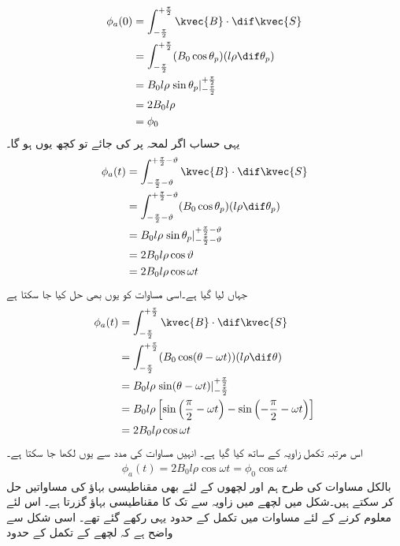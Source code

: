 \begin{gather}
\begin{aligned}
\phi_a(0)&=\int_{-\frac{\pi}{2}}^{+\frac{\pi}{2}} \kvec{B} \cdot \dif \kvec{S}\\
&=\int_{-\frac{\pi}{2}}^{+\frac{\pi}{2}} (B_0 \cos \theta_p)(l \rho \dif \theta_p)\\
&=B_0 l \rho \left. \sin \theta_p \right|_{-\frac{\pi}{2}}^{+\frac{\pi}{2}}\\
&=2 B_0 l \rho\\
&=\phi_0
\end{aligned}
\end{gather}
 یہی حساب اگر لمحہ  پر کی جائے تو کچھ یوں ہو گا۔
\begin{gather}
\begin{aligned}
\phi_a(t)&=\int_{-\frac{\pi}{2}-\vartheta}^{+\frac{\pi}{2}-\vartheta} \kvec{B} \cdot \dif \kvec{S}\\
&=\int_{-\frac{\pi}{2}-\vartheta}^{+\frac{\pi}{2}-\vartheta} (B_0 \cos \theta_p)(l \rho \dif \theta_p)\\
&=B_0 l \rho \left. \sin \theta_p \right|_{-\frac{\pi}{2}-\vartheta}^{+\frac{\pi}{2}-\vartheta}\\
&=2 B_0 l \rho \cos \vartheta\\
&=2 B_0 l \rho \cos \omega t
\end{aligned}
\end{gather}
جہاں  لیا گیا ہے۔اسی مساوات کو یوں بھی حل کیا جا سکتا ہے
\begin{gather}
\begin{aligned}
\phi_a(t)&=\int_{-\frac{\pi}{2}}^{+\frac{\pi}{2}} \kvec{B} \cdot \dif \kvec{S}\\
&=\int_{-\frac{\pi}{2}}^{+\frac{\pi}{2}} (B_0 \cos (\theta-\omega t))(l \rho \dif \theta)\\
&=B_0 l \rho \left. \sin (\theta-\omega t) \right|_{-\frac{\pi}{2}}^{+\frac{\pi}{2}}\\
&=B_0 l \rho \left[\sin \left(\frac{\pi}{2}-\omega t \right )-\sin \left (-\frac{\pi}{2}-\omega t \right) \right]\\
&=2 B_0 l \rho \cos \omega t
\end{aligned}
\end{gather}
اس مرتبہ تکمل زاویہ  کے ساتھ کیا گیا ہے۔ انہیں مساوات  کی مدد سے یوں لکھا جا سکتا ہے۔
\begin{align}
\phi_a(t)=2 B_0 l \rho \cos \omega t=\phi_0 \cos \omega t
\end{align}
بالکل مساوات  کی طرح ہم   اور  لچھوں کے لئے  بھی مقناطیسی بہاؤ کی مساواتیں حل کر سکتے ہیں۔شکل  میں  لچھے میں زاویہ  سے   تک کا مقناطیسی بہاؤ گزرتا ہے۔ اس لئے   معلوم کرنے کے لئے مساوات  میں تکمل کے حدود یہی رکھے گئے تھے۔ اسی شکل سے واضح ہے کہ  لچھے کے تکمل کے حدود 
